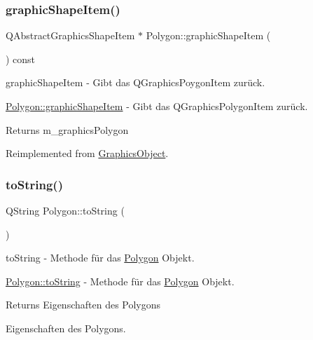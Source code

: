 \subsubsection{\texorpdfstring{graphic\+Shape\+Item()}{graphicShapeItem()}}
{\footnotesize\ttfamily Q\+Abstract\+Graphics\+Shape\+Item $\ast$ Polygon\+::graphic\+Shape\+Item (\begin{DoxyParamCaption}{ }\end{DoxyParamCaption}) const\hspace{0.3cm}{\ttfamily [virtual]}}



graphic\+Shape\+Item -\/ Gibt das Q\+Graphics\+Poygon\+Item zurück. 

\hyperlink{class_polygon_aebf0f177dbc4da17a1822be5a0063b25}{Polygon\+::graphic\+Shape\+Item} -\/ Gibt das Q\+Graphics\+Polygon\+Item zurück.

\begin{DoxyReturn}{Returns}
m\+\_\+graphics\+Polygon


\end{DoxyReturn}


Reimplemented from \hyperlink{class_graphics_object_ad898be2fdbcc4c57f908cdd6a3feaa44}{Graphics\+Object}.

\mbox{\label{class_polygon_a588df36c92bfa626e0a16acb07162fa3}} 
\subsubsection{\texorpdfstring{to\+String()}{toString()}}
{\footnotesize\ttfamily Q\+String Polygon\+::to\+String (\begin{DoxyParamCaption}{ }\end{DoxyParamCaption})\hspace{0.3cm}{\ttfamily [virtual]}}



to\+String -\/ Methode für das \hyperlink{class_polygon}{Polygon} Objekt. 

\hyperlink{class_polygon_a588df36c92bfa626e0a16acb07162fa3}{Polygon\+::to\+String} -\/ Methode für das \hyperlink{class_polygon}{Polygon} Objekt.

\begin{DoxyReturn}{Returns}
Eigenschaften des Polygons

Eigenschaften des Polygons. 
\end{DoxyReturn}


